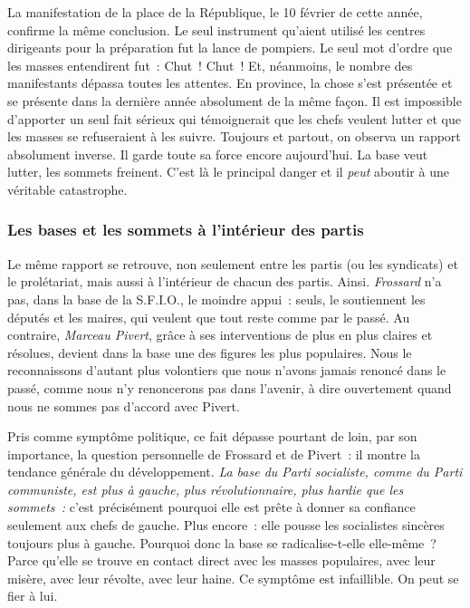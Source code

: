 \documentclass[french,twoside]{book} %
\begin{document}
La manifestation de la place de la République, le 10 février de cette année, confirme la même conclusion. Le seul instrument qu’aient utilisé les centres dirigeants pour la préparation fut la lance de pompiers. Le seul mot d’ordre que les masses entendirent fut : Chut ! Chut ! Et, néanmoins, le nombre des manifestants dépassa toutes les attentes. En province, la chose s’est présentée et se présente dans la dernière année absolument de la même  façon. Il est impossible d’apporter un seul fait sérieux qui témoignerait que les chefs veulent lutter et que les masses se refuseraient à les suivre. Toujours et partout, on observa un rapport absolument inverse. Il garde toute sa force encore aujourd’hui. La base veut lutter, les sommets freinent. C’est là le principal danger et il \emph{peut} aboutir à une véritable catastrophe.
\subsubsection[{Les bases et les sommets à l’intérieur des partis}]{Les bases et les sommets à l’intérieur des partis}
\noindent Le même rapport se retrouve, non seulement entre les partis (ou les syndicats) et le prolétariat, mais aussi à l’intérieur de chacun des partis. Ainsi. \emph{Frossard} n’a pas, dans la base de la S.F.I.O., le moindre appui : seuls, le soutiennent les députés et les maires, qui veulent que tout reste comme par le passé. Au contraire, \emph{Marceau Pivert}, grâce à ses interventions de plus en plus claires et résolues, devient dans la base une des figures les plus populaires. Nous le reconnaissons d’autant plus volontiers que nous n’avons jamais renoncé dans le passé, comme nous n’y renoncerons pas dans l’avenir, à dire ouvertement quand nous ne sommes pas d’accord avec Pivert.\par
Pris comme symptôme politique, ce fait dépasse pourtant de loin, par son importance, la question personnelle de Frossard et de Pivert : il montre la tendance générale du développement. \emph{La base du Parti socialiste, comme du Parti communiste, est plus à gauche, plus révolutionnaire, plus hardie que les sommets :} c’est précisément pourquoi elle est prête à donner sa confiance seulement aux chefs de gauche. Plus encore : elle pousse les socialistes sincères toujours plus à gauche. Pourquoi donc la base se radicalise-t-elle elle-même ? Parce qu’elle se trouve en contact direct avec les masses populaires, avec leur misère, avec leur révolte, avec leur haine. Ce symptôme est infaillible. On peut se fier à lui.
\end{document}
